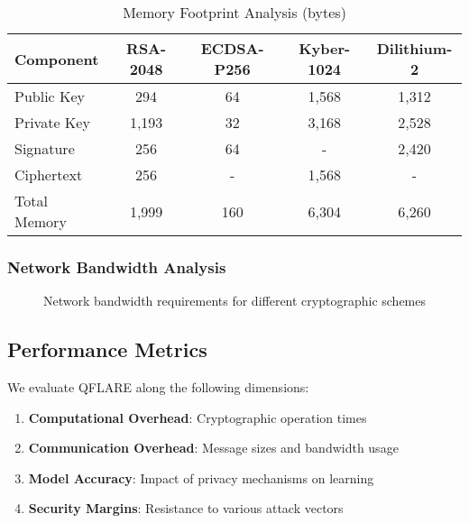 \documentclass[journal,onecolumn,draftclsnofoot]{IEEEtran}
\begin{document}
\begin{table}[h]
\centering
\caption{Memory Footprint Analysis (bytes)}
\begin{tabular}{|l|c|c|c|c|}
\hline
\textbf{Component} & \textbf{RSA-2048} & \textbf{ECDSA-P256} & \textbf{Kyber-1024} & \textbf{Dilithium-2} \\
\hline
Public Key & 294 & 64 & 1,568 & 1,312 \\
Private Key & 1,193 & 32 & 3,168 & 2,528 \\
Signature & 256 & 64 & - & 2,420 \\
Ciphertext & 256 & - & 1,568 & - \\
Total Memory & 1,999 & 160 & 6,304 & 6,260 \\
\hline
\end{tabular}
\end{table}

\subsubsection{Network Bandwidth Analysis}

\begin{figure}[h]
\centering
{}
\caption{Network bandwidth requirements for different cryptographic schemes}
\end{figure}

\subsection{Performance Metrics}

We evaluate QFLARE along the following dimensions:

\begin{enumerate}
\item \textbf{Computational Overhead}: Cryptographic operation times
\item \textbf{Communication Overhead}: Message sizes and bandwidth usage
\item \textbf{Model Accuracy}: Impact of privacy mechanisms on learning
\item \textbf{Security Margins}: Resistance to various attack vectors
\end{enumerate}
\end{document}
